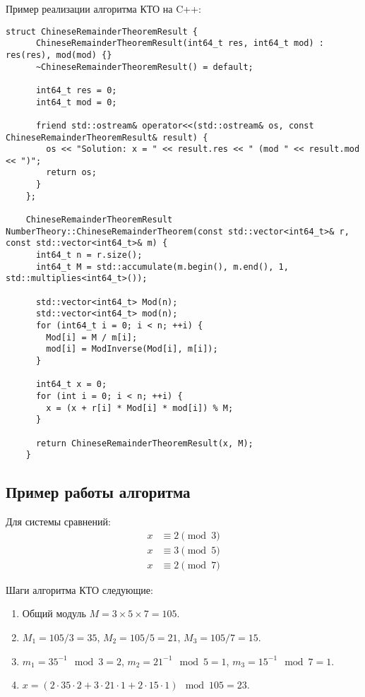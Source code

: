 \documentclass[12pt, a4paper, openany]{book}
\begin{document}
\newpage
\noindent
    Пример реализации алгоритма КТО на C++:
    
\begin{lstlisting}[breaklines=true]
    struct ChineseRemainderTheoremResult {
      ChineseRemainderTheoremResult(int64_t res, int64_t mod) : res(res), mod(mod) {}
      ~ChineseRemainderTheoremResult() = default;
    
      int64_t res = 0;
      int64_t mod = 0;
    
      friend std::ostream& operator<<(std::ostream& os, const ChineseRemainderTheoremResult& result) {
        os << "Solution: x = " << result.res << " (mod " << result.mod << ")";
        return os;
      }
    };
    
    ChineseRemainderTheoremResult NumberTheory::ChineseRemainderTheorem(const std::vector<int64_t>& r, const std::vector<int64_t>& m) {
      int64_t n = r.size();
      int64_t M = std::accumulate(m.begin(), m.end(), 1, std::multiplies<int64_t>());
    
      std::vector<int64_t> Mod(n);
      std::vector<int64_t> mod(n);
      for (int64_t i = 0; i < n; ++i) {
        Mod[i] = M / m[i];
        mod[i] = ModInverse(Mod[i], m[i]);
      }
    
      int64_t x = 0;
      for (int i = 0; i < n; ++i) {
        x = (x + r[i] * Mod[i] * mod[i]) % M;
      }
    
      return ChineseRemainderTheoremResult(x, M);
    }
\end{lstlisting}

\subsection{Пример работы алгоритма}

Для системы сравнений:
    \[
    \begin{aligned}
    x &\equiv 2 \pmod{3} \\
    x &\equiv 3 \pmod{5} \\
    x &\equiv 2 \pmod{7}
    \end{aligned}
    \]

\noindent
    Шаги алгоритма КТО следующие:

\begin{enumerate}
    \item Общий модуль $M = 3 \times 5 \times 7 = 105$.
    \item $M_1 = 105/3 = 35$, $M_2 = 105/5 = 21$, $M_3 = 105/7 = 15$.
    \item $m_1 = 35^{-1} \mod 3 = 2$, $m_2 = 21^{-1} \mod 5 = 1$, $m_3 = 15^{-1} \mod 7 = 1$.
    \item $x = (2 \cdot 35 \cdot 2 + 3 \cdot 21 \cdot 1 + 2 \cdot 15 \cdot 1) \mod 105 = 23$.
\end{enumerate}
\end{document}
